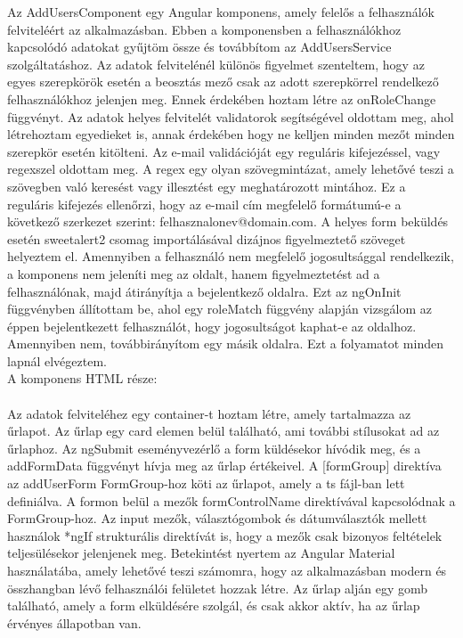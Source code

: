 Az AddUsersComponent egy Angular komponens, amely felelős a felhasználók felviteléért az alkalmazásban. Ebben a komponensben a felhasználókhoz kapcsolódó adatokat gyűjtöm össze és továbbítom az AddUsersService szolgáltatáshoz. Az adatok felvitelénél különös figyelmet szenteltem, hogy az egyes szerepkörök esetén a beosztás mező csak az adott szerepkörrel rendelkező felhasználókhoz jelenjen meg. Ennek érdekében hoztam létre az onRoleChange függvényt. Az adatok helyes felvitelét validatorok segítségével oldottam meg, ahol létrehoztam egyedieket is, annak érdekében hogy ne kelljen minden mezőt minden szerepkör esetén kitölteni. Az e-mail validációját egy reguláris kifejezéssel, vagy regexszel oldottam meg. A regex egy olyan szövegmintázat, amely lehetővé teszi a szövegben való keresést vagy illesztést egy meghatározott mintához. Ez a reguláris kifejezés ellenőrzi, hogy az e-mail cím megfelelő formátumú-e a következő szerkezet szerint: felhasznalonev@domain.com. A helyes form beküldés esetén sweetalert2 csomag importálásával dizájnos figyelmeztető szöveget helyeztem el. Amennyiben a felhasználó nem megfelelő jogosultsággal rendelkezik, a komponens nem jeleníti meg az oldalt, hanem figyelmeztetést ad a felhasználónak, majd átirányítja a bejelentkező oldalra. Ezt az ngOnInit függvényben állítottam be, ahol egy roleMatch függvény alapján vizsgálom az éppen bejelentkezett felhasználót, hogy jogosultságot kaphat-e az oldalhoz. Amennyiben nem, továbbirányítom egy másik oldalra. Ezt a folyamatot minden lapnál elvégeztem.\\
\newpage
A komponens HTML része:\\
\\
Az adatok felviteléhez egy container-t hoztam létre, amely tartalmazza az űrlapot. Az űrlap egy card elemen belül található, ami további stílusokat ad az űrlaphoz. Az ngSubmit eseményvezérlő a form küldésekor hívódik meg, és a addFormData függvényt hívja meg az űrlap értékeivel. A [formGroup] direktíva az addUserForm FormGroup-hoz köti az űrlapot, amely a ts fájl-ban lett definiálva. A formon belül a mezők formControlName direktívával kapcsolódnak a FormGroup-hoz. Az input mezők, választógombok és dátumválasztók mellett használok *ngIf strukturális direktívát is, hogy a mezők csak bizonyos feltételek teljesülésekor jelenjenek meg. Betekintést nyertem az Angular Material használatába, amely lehetővé teszi számomra, hogy az alkalmazásban modern és összhangban lévő felhasználói felületet hozzak létre. Az űrlap alján egy gomb található, amely a form elküldésére szolgál, és csak akkor aktív, ha az űrlap érvényes állapotban van. 

